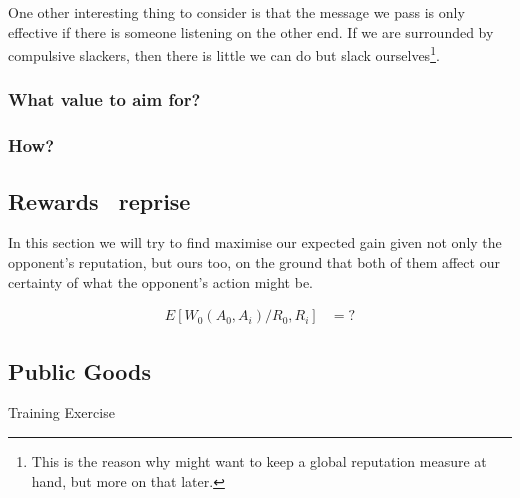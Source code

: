 \documentclass[10pt,fleqn]{article}
\begin{document}
One other interesting thing to consider is that the message we pass is only
effective if there is someone listening on the other end. If we are surrounded
by compulsive slackers, then there is little we can do but slack
ourselves\footnote{This is the reason why might want to keep a global reputation
measure at hand, but more on that later.}.


\subsubsection{What value to aim for?}

\subsubsection{How?}

\subsection{Rewards \dash\ reprise}

In this section we will try to find maximise our expected gain given not only the
opponent's reputation, but ours too, on the ground that both of them affect our
certainty of what the opponent's action might be.

\begin{align*}
  E[W_0(A_0, A_i) / R_0, R_i] &= ?
\end{align*}

\subsection{Public Goods}
\begin{quotation}
\end{quotation}
\hfill Training Exercise
\end{document}
